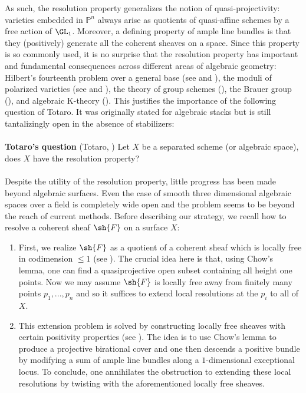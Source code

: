\documentclass[12pt]{amsart}
\begin{document}
\noindent As such, the resolution property generalizes the notion of quasi-projectivity: varieties embedded in $\mathbb{P}^n$ always arise as quotients of quasi-affine schemes by a free action of $\GL_1$. Moreover, a defining property of ample line bundles is that they (positively) generate all the coherent sheaves on a space. Since this property is so commonly used, it is no surprise that the resolution property has important and fundamental consequences across different areas of algebraic geometry: Hilbert's fourteenth problem over a general base (see \cite[Thm. 2]{Seshadri} and \cite[Thm 3.8]{ThomasonRes}), the moduli of polarized varieties (see \cite[Ques. 43]{MR2259254} and \cite[Conj. 42]{MR2259254}), the theory of group schemes (\cite{ConradDual}), the Brauer group (\cite{SidRes}), and algebraic K-theory (\cite[Sec. 2]{TotaroRes}). This justifies the importance of the following question of Totaro. It was originally stated for algebraic stacks but is still tantalizingly open in the absence of stabilizers: 
\\\\
\noindent \textbf{Totaro's question} (Totaro, \cite[Ques. 1]{TotaroRes}) Let $X$ be a separated scheme (or algebraic space), does $X$ have the resolution property? 
\\\\
Despite the utility of the resolution property, little progress has been made beyond algebraic surfaces. Even the case of smooth three dimensional algebraic spaces over a field is completely wide open and the problem seems to be beyond the reach of current methods. Before describing our strategy, we recall how to resolve a coherent sheaf $\sh{F}$ on a surface $X$:\begin{enumerate} 

\item First, we realize $\sh{F}$ as a quotient of a coherent sheaf which is locally free in codimension $\leq 1$ (see \cite[Prop. 1.8]{SurfaceRes}). 
The crucial idea here is that, using Chow's lemma, one can find a quasiprojective open subset containing all height one points. Now we may assume $\sh{F}$ is locally free away from finitely many points $p_1,...,p_n$ and so it suffices to extend local resolutions at the $p_i$ to all of $X$.

\item This extension problem is solved by constructing locally free sheaves with certain positivity properties (see \cite[Thm. 4.5]{SurfaceRes}). The idea is to use Chow's lemma to produce a projective birational cover and one then descends a positive bundle by modifying a sum of ample line bundles along a $1$-dimensional exceptional locus. To conclude, one annihilates the obstruction to extending these local resolutions by twisting with the aforementioned locally free sheaves. \end{enumerate}
\end{document}
